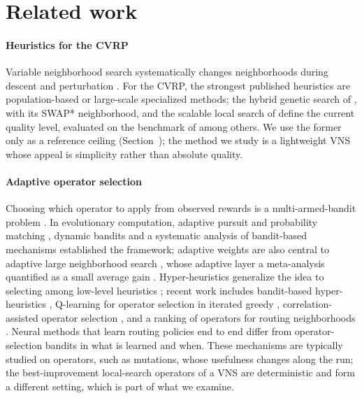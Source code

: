 \section{Related work}\label{sec:related}

\paragraph{Heuristics for the CVRP}
Variable neighborhood search systematically changes neighborhoods during descent and perturbation \citep{mladenovic1997,hansen2001}. For the CVRP, the strongest published heuristics are population-based or large-scale specialized methods; the hybrid genetic search of \citet{vidal2022}, with its SWAP* neighborhood, and the scalable local search of \citet{accorsi2021} define the current quality level, evaluated on the benchmark of \citet{uchoa2017} among others. We use the former only as a reference ceiling (Section~); the method we study is a lightweight VNS whose appeal is simplicity rather than absolute quality.

\paragraph{Adaptive operator selection}
Choosing which operator to apply from observed rewards is a multi-armed-bandit problem \citep{auer2002,suttonbarto2018}. In evolutionary computation, adaptive pursuit and probability matching \citep{thierens2005}, dynamic bandits \citep{dacosta2008} and a systematic analysis of bandit-based mechanisms \citep{fialho2010} established the framework; adaptive weights are also central to adaptive large neighborhood search \citep{ropke2006}, whose adaptive layer a meta-analysis quantified as a small average gain \citep{turkes2021}. Hyper-heuristics generalize the idea to selecting among low-level heuristics \citep{burke2013}; recent work includes bandit-based hyper-heuristics \citep{lagos2024}, Q-learning for operator selection in iterated greedy \citep{karimimamaghan2023}, correlation-assisted operator selection \citep{pei2023}, and a ranking of operators for routing neighborhoods \citep{voigt2025}. Neural methods that learn routing policies end to end \citep{kool2019} differ from operator-selection bandits in what is learned and when. These mechanisms are typically studied on operators, such as mutations, whose usefulness changes along the run; the best-improvement local-search operators of a VNS are deterministic and form a different setting, which is part of what we examine.

